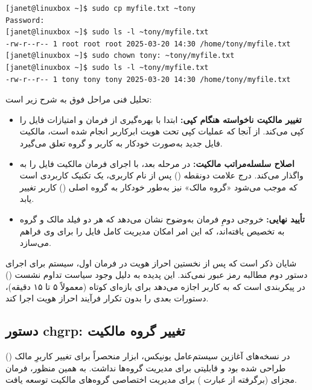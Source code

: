 \begin{latin}
\begin{lstlisting}
[janet@linuxbox ~]$ sudo cp myfile.txt ~tony
Password:
[janet@linuxbox ~]$ sudo ls -l ~tony/myfile.txt
-rw-r--r-- 1 root root root 2025-03-20 14:30 /home/tony/myfile.txt
[janet@linuxbox ~]$ sudo chown tony: ~tony/myfile.txt
[janet@linuxbox ~]$ sudo ls -l ~tony/myfile.txt
-rw-r--r-- 1 tony tony tony 2025-03-20 14:30 /home/tony/myfile.txt
\end{lstlisting}
\end{latin}

تحلیل فنی مراحل فوق به شرح زیر است:

\begin{itemize}
  \item \textbf{تغییر مالکیت ناخواسته هنگام کپی:} ابتدا  با بهره‌گیری از فرمان  و امتیازات  فایل را کپی می‌کند. از آنجا که عملیات کپی تحت هویت ابرکاربر انجام شده است، مالکیت فایل جدید به‌صورت خودکار به کاربر و گروه  تعلق می‌گیرد.
  \item \textbf{اصلاح سلسله‌مراتب مالکیت:} در مرحله بعد،  با اجرای فرمان  مالکیت فایل را به  واگذار می‌کند. درج علامت دونقطه (\cmd{:}) پس از نام کاربری، یک تکنیک کاربردی است که موجب می‌شود «گروه مالک» نیز به‌طور خودکار به گروه اصلی () کاربر  تغییر یابد.
  \item \textbf{تأیید نهایی:} خروجی دومِ فرمان  به‌وضوح نشان می‌دهد که هر دو فیلد مالک و گروه به  تخصیص یافته‌اند، که این امر امکان مدیریت کامل فایل را برای وی فراهم می‌سازد.
\end{itemize}

شایان ذکر است که پس از نخستین احراز هویت در فرمان اول، سیستم برای اجرای دستور دوم مطالبه رمز عبور نمی‌کند. این پدیده به دلیل وجود سیاست تداوم نشست () در پیکربندی  است که به کاربر اجازه می‌دهد برای بازه‌ای کوتاه (معمولاً ۵ تا ۱۵ دقیقه)، دستورات بعدی را بدون تکرار فرآیند احراز هویت اجرا کند.

\subsection{دستور chgrp: تغییر گروه مالکیت}

در نسخه‌های آغازین سیستم‌عامل یونیکس، ابزار  منحصراً برای تغییر کاربرِ مالک () طراحی شده بود و قابلیتی برای مدیریت گروه‌ها نداشت. به همین منظور، فرمان مجزای  (برگرفته از عبارت ) برای مدیریت اختصاصی گروه‌های مالکیت توسعه یافت.

